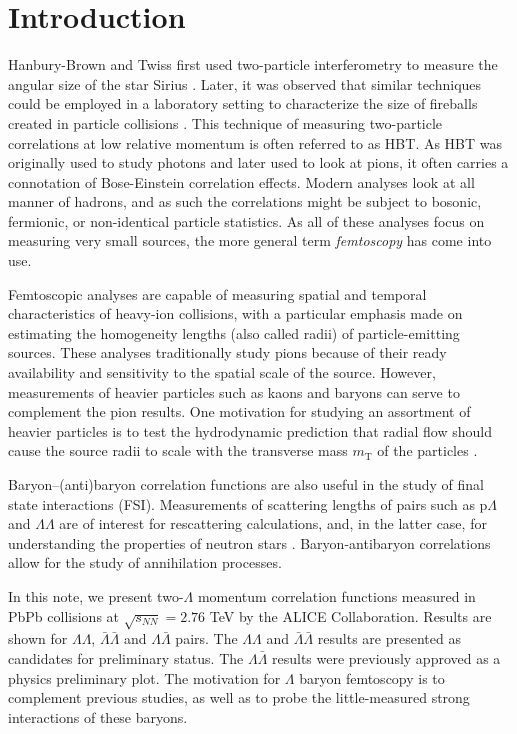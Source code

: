 \section{Introduction}


Hanbury-Brown and Twiss first used two-particle interferometry to measure the angular size of the star Sirius \cite{HanburyBrown:1956bqd}.
Later, it was observed that similar techniques could be employed in a laboratory setting to characterize the size of fireballs created in particle collisions \cite{Goldhaber:1960sf}.
This technique of measuring two-particle correlations at low relative momentum is often referred to as HBT.
As HBT was originally used to study photons and later used to look at pions, it often carries a connotation of Bose-Einstein correlation effects.
Modern analyses look at all manner of hadrons, and as such the correlations might be subject to bosonic, fermionic, or non-identical particle statistics.
As all of these analyses focus on measuring very small sources, the more general term \textit{femtoscopy} has come into use.


Femtoscopic analyses are capable of measuring spatial and temporal characteristics of heavy-ion collisions, with a particular emphasis made on estimating the homogeneity lengths (also called radii) of particle-emitting sources.  
These analyses traditionally study pions \cite{Goldhaber:1960sf,Aamodt:2011mr} because of their ready availability and sensitivity to the spatial scale of the source.  
However, measurements of heavier particles such as kaons \cite{Abelev:2012ms} and baryons \cite{Gos:2007cj} can serve to complement the pion results.  
One motivation for studying an assortment of heavier particles is to test the hydrodynamic prediction that radial flow should cause the source radii to scale with the transverse mass $m_{\mathrm{T}}$ of the particles \cite{Csorgo:1995bi,Lisa:2005dd}.

Baryon--(anti)baryon correlation functions are also useful in the study of final state interactions (FSI).  
Measurements of scattering lengths of pairs such as p$\Lambda$ and $\Lambda\Lambda$ are of interest for rescattering calculations, and, in the latter case, for understanding the properties of neutron stars \cite{SchaffnerBielich:2008kb,Wang:2010gr}.  
Baryon-antibaryon correlations allow for the study of annihilation processes.  

In this note, we present two-$\Lambda$ momentum correlation functions measured in PbPb collisions at $\sqrt{s_{NN}}=2.76$ TeV by the ALICE Collaboration.  
Results are shown for $\Lambda\Lambda$, $\bar{\Lambda}\bar{\Lambda}$ and $\Lambda\bar{\Lambda}$ pairs. 
The $\Lambda\Lambda$ and $\bar{\Lambda}\bar{\Lambda}$ results are presented as candidates for preliminary status. 
The $\Lambda\bar{\Lambda}$ results were previously approved as a physics preliminary plot.  
The motivation for $\Lambda$ baryon femtoscopy is to complement previous studies, as well as to probe the little-measured strong interactions of these baryons.

